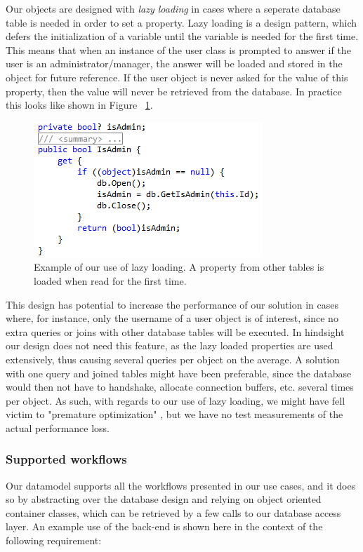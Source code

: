 Our objects are designed with \emph{lazy loading} in cases where a seperate database table is needed in order to set a property. Lazy loading is a design pattern, which defers the initialization of a variable until the variable is needed for the first time. This means that when an instance of the user class is prompted to answer if the user is an administrator/manager, the answer will be loaded and stored in the object for future reference. If the user object is never asked for the value of this property, then the value will never be retrieved from the database. In practice this looks like shown in Figure ~\ref{fig:lazyload}.

\begin{figure}[hbt]
	\centering
	\includegraphics[scale=1]{./p1design/lazyload.png}
	\caption{Example of our use of lazy loading. A property from other tables is loaded when read for the first time.}
	\label{fig:lazyload}
\end{figure}


This design has potential to increase the performance of our solution in cases where, for instance, only the username of a user object is of interest, since no extra queries or joins with other database tables will be executed. In hindsight our design does not need this feature, as the lazy loaded properties are used extensively, thus causing several queries per object on the average. A solution with one query and joined tables might have been preferable, since the database would then not have to handshake, allocate connection buffers, etc. several times per object. As such, with regards to our use of lazy loading, we might have fell victim to "premature optimization" \cite{premoptim}, but we have no test measurements of the actual performance loss.


\subsubsection{Supported workflows}
Our datamodel supports all the workflows presented in our use cases, and it
does so by abstracting over the database design and relying on object oriented
container classes, which can be retrieved by a few calls to our database access
layer. An example use of the back-end is shown here in the context of the
following requirement:

